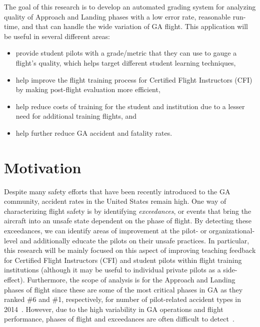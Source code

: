 	The goal of this research is to develop an automated grading system for analyzing quality of Approach and Landing phases with a low error rate, reasonable run-time, and that can handle the wide variation of GA flight.  This application will be useful in several different areas:
%
    \begin{itemize}
    	\item provide student pilots with a grade/metric that they can use to gauge a flight's quality, which helps target different student learning techniques,
        \item help improve the flight training process for Certified Flight Instructors (CFI) by making post-flight evaluation more efficient,
        \item help reduce costs of training for the student and institution due to a lesser need for additional training flights, and
        \item help further reduce GA accident and fatality rates.
    \end{itemize}
    

\section{Motivation} \label{sec:motivation}

	Despite many safety efforts that have been recently introduced to the GA community, accident rates in the United States remain high.  One way of characterizing flight safety is by identifying \textit{exceedances}, or events that bring the aircraft into an unsafe state dependent on the phase of flight.  By detecting these exceedances, we can identify areas of improvement at the pilot- or organizational-level and additionally educate the pilots on their unsafe practices.  In particular, this research will be mainly focused on this aspect of improving teaching feedback for Certified Flight Instructors (CFI) and student pilots within flight training institutions (although it may be useful to individual private pilots as a side-effect).  Furthermore, the scope of analysis is for the Approach and Landing phases of flight since these are some of the most critical phases in GA as they ranked \#6 and \#1, respectively, for number of pilot-related accident types in 2014~\cite{kenny201726th}.  However, due to the high variability in GA operations and flight performance, phases of flight and exceedances are often difficult to detect~\cite{goblet2015identifying,goblet2016phase,fala2016detecting}.
    
